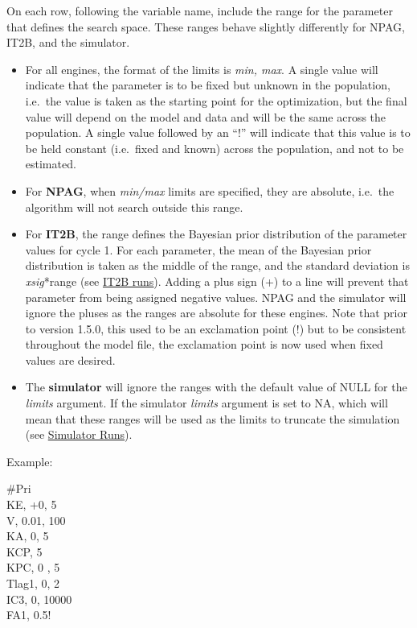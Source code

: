 \documentclass[
]{book}
\begin{document}
On each row, following the variable name, include the range for the
parameter that defines the search space. These ranges behave slightly
differently for NPAG, IT2B, and the simulator.

\begin{itemize}
\item
  For all engines, the format of the limits is \emph{min, max}. A single
  value will indicate that the parameter is to be fixed but unknown in
  the population, i.e.~the value is taken as the starting point for
  the optimization, but the final value will depend on the model and
  data and will be the same across the population. A single value
  followed by an ``!'' will indicate that this value is to be held
  constant (i.e.~fixed and known) across the population, and not to be
  estimated.
\item
  For \textbf{NPAG}, when \emph{min/max} limits are specified, they are
  absolute, i.e.~the algorithm will not search outside this range.
\item
  For \textbf{IT2B}, the range defines the Bayesian prior distribution of
  the parameter values for cycle 1. For each parameter, the mean of
  the Bayesian prior distribution is taken as the middle of the range,
  and the standard deviation is \emph{xsig}*range (see \href{/l}{\uline{IT2B
  runs}}). Adding a plus sign (+) to a line will
  prevent that parameter from being assigned negative values. NPAG and
  the simulator will ignore the pluses as the ranges are absolute for
  these engines. Note that prior to version 1.5.0, this used to be an
  exclamation point (!) but to be consistent throughout the model
  file, the exclamation point is now used when fixed values are
  desired.
\item
  The \textbf{simulator} will ignore the ranges with the default value of
  NULL for the \emph{limits} argument. If the simulator \emph{limits} argument
  is set to NA, which will mean that these ranges will be used as the
  limits to truncate the simulation (see \href{/l}{\uline{Simulator
  Runs}}).
\end{itemize}

Example:

\#Pri\\
KE, +0, 5\\
V, 0.01, 100\\
KA, 0, 5\\
KCP, 5\\
KPC, 0 , 5\\
Tlag1, 0, 2\\
IC3, 0, 10000\\
FA1, 0.5!
\end{document}
